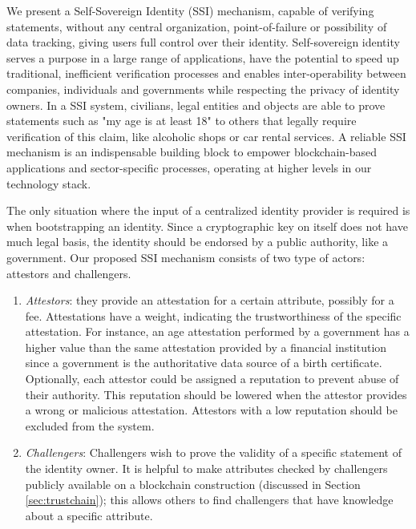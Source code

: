 \documentclass[USenglish]{article}
\begin{document}
We present a Self-Sovereign Identity (SSI) mechanism, capable of verifying statements, without any central organization, point-of-failure or possibility of data tracking, giving users full control over their identity.
Self-sovereign identity serves a purpose in a large range of applications, have the potential to speed up traditional, inefficient verification processes and enables inter-operability between companies, individuals and governments while respecting the privacy of identity owners.
In a SSI system, civilians, legal entities and objects are able to prove statements such as "my age is at least 18" to others that legally require verification of this claim, like alcoholic shops or car rental services.
A reliable SSI mechanism is an indispensable building block to empower blockchain-based applications and sector-specific processes, operating at higher levels in our technology stack.

The only situation where the input of a centralized identity provider is required is when bootstrapping an identity.
Since a cryptographic key on itself does not have much legal basis, the identity should be endorsed by a public authority, like a government.
Our proposed SSI mechanism consists of two type of actors: attestors and challengers.
\begin{enumerate}
	\item \emph{Attestors}: they provide an attestation for a certain attribute, possibly for a fee. Attestations have a weight, indicating the trustworthiness of the specific attestation. For instance, an age attestation performed by a government has a higher value than the same attestation provided by a financial institution since a government is the authoritative data source of a birth certificate. Optionally, each attestor could be assigned a reputation to prevent abuse of their authority. This reputation should be lowered when the attestor provides a wrong or malicious attestation. Attestors with a low reputation should be excluded from the system.
	\item \emph{Challengers}: Challengers wish to prove the validity of a specific statement of the identity owner. It is helpful to make attributes checked by challengers publicly available on a blockchain construction (discussed in Section \ref{sec:trustchain}); this allows others to find challengers that have knowledge about a specific attribute.
\end{enumerate}
\end{document}
